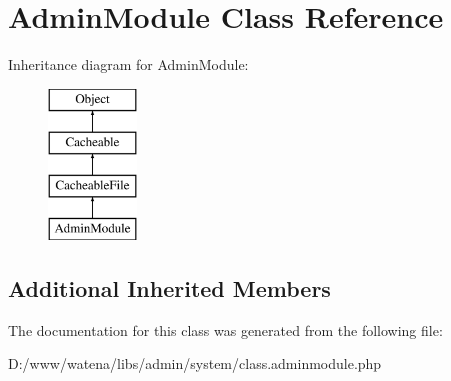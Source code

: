 \hypertarget{class_admin_module}{\section{Admin\-Module Class Reference}
\label{class_admin_module}
}
Inheritance diagram for Admin\-Module\-:\begin{figure}[H]
\begin{center}
\leavevmode
\includegraphics[height=4.000000cm]{class_admin_module}
\end{center}
\end{figure}
\subsection*{Additional Inherited Members}


The documentation for this class was generated from the following file\-:\begin{DoxyCompactItemize}
\item 
D\-:/www/watena/libs/admin/system/class.\-adminmodule.\-php\end{DoxyCompactItemize}
